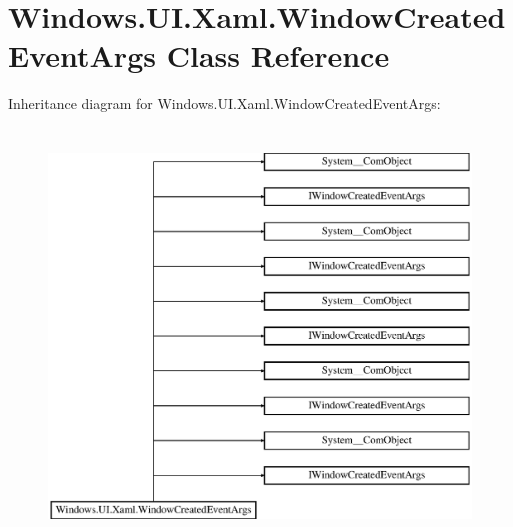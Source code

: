 \hypertarget{class_windows_1_1_u_i_1_1_xaml_1_1_window_created_event_args}{}\section{Windows.\+U\+I.\+Xaml.\+Window\+Created\+Event\+Args Class Reference}
\label{class_windows_1_1_u_i_1_1_xaml_1_1_window_created_event_args}
Inheritance diagram for Windows.\+U\+I.\+Xaml.\+Window\+Created\+Event\+Args\+:\begin{figure}[H]
\begin{center}
\leavevmode
\includegraphics[height=11.000000cm]{class_windows_1_1_u_i_1_1_xaml_1_1_window_created_event_args}
\end{center}
\end{figure}
